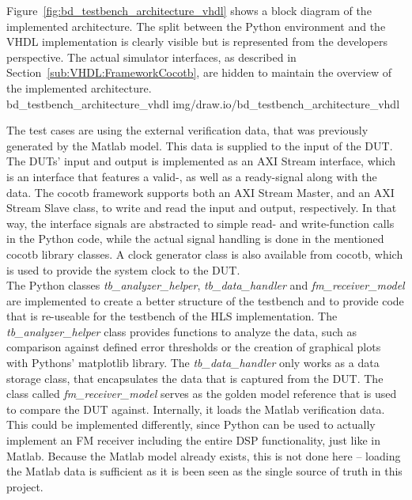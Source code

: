 Figure~\ref{fig:bd_testbench_architecture_vhdl} shows a block diagram of the implemented architecture.
The split between the Python environment and the VHDL implementation is clearly visible but is represented from the developers perspective.
The actual simulator interfaces, as described in Section~\ref{sub:VHDL:FrameworkCocotb}, are hidden to maintain the overview of the implemented architecture.\\

 {bd_testbench_architecture_vhdl} {img/draw.io/bd_testbench_architecture_vhdl}

The test cases are using the external verification data, that was previously generated by the Matlab model.
This data is supplied to the input of the DUT.
The DUTs' input and output is implemented as an AXI Stream interface, which is an interface that features a valid-, as well as a ready-signal along with the data.
The cocotb framework supports both an AXI Stream Master, and an AXI Stream Slave class, to write and read the input and output, respectively.
In that way, the interface signals are abstracted to simple read- and write-function calls in the Python code, while the actual signal handling is done in the mentioned cocotb library classes.
A clock generator class is also available from cocotb, which is used to provide the system clock to the DUT.\\

The Python classes \textit{tb\_analyzer\_helper}, \textit{tb\_data\_handler} and \textit{fm\_receiver\_model} are implemented to create a better structure of the testbench and to provide code that is re-useable for the testbench of the HLS implementation.
The \textit{tb\_analyzer\_helper} class provides functions to analyze the data, such as comparison against defined error thresholds or the creation of graphical plots with Pythons' matplotlib library.
The \textit{tb\_data\_handler} only works as a data storage class, that encapsulates the data that is captured from the DUT.
The class called \textit{fm\_receiver\_model} serves as the golden model reference that is used to compare the DUT against.
Internally, it loads the Matlab verification data.
This could be implemented differently, since Python can be used to actually implement an FM receiver including the entire DSP functionality, just like in Matlab.
Because the Matlab model already exists, this is not done here -- loading the Matlab data is sufficient as it is been seen as the single source of truth in this project.\\

